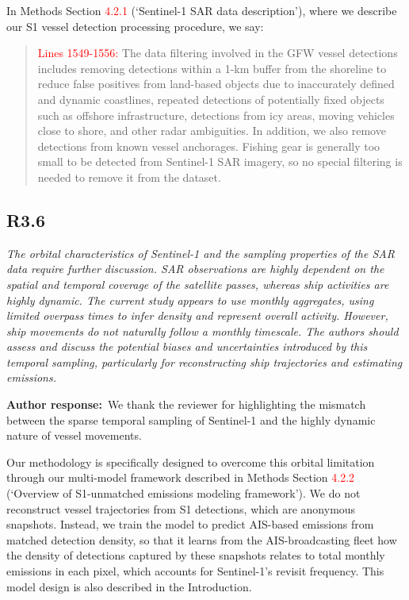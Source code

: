 \documentclass[11pt]{article}
\newcommand{\point}[1]{\subsection*{\normalfont\bfseries #1}}
\newcommand{\response}{\par\medskip\noindent%
  \textbf{\textcolor{respblue}{Author response:}}\ }
\begin{document}
In Methods Section \textcolor{red}{4.2.1} (`Sentinel-1 SAR data description'), where we describe our S1 vessel detection processing procedure, we say:

\begin{quote}
\textcolor{red}{Lines 1549-1556:} The data filtering involved in the GFW vessel detections includes removing detections within a 1-km buffer from the shoreline to reduce false positives from land-based objects due to inaccurately defined and dynamic coastlines, repeated detections of potentially fixed objects such as offshore infrastructure, detections from icy areas, moving vehicles close to shore, and other radar ambiguities. In addition, we also remove detections from known vessel anchorages. Fishing gear is generally too small to be detected from Sentinel-1 SAR imagery, so no special filtering is needed to remove it from the dataset.
\end{quote}

\point{R3.6}

\begin{refquote}\itshape
The orbital characteristics of Sentinel-1 and the sampling properties of the SAR
data require further discussion. SAR observations are highly dependent on the
spatial and temporal coverage of the satellite passes, whereas ship activities
are highly dynamic. The current study appears to use monthly aggregates, using
limited overpass times to infer density and represent overall activity. However,
ship movements do not naturally follow a monthly timescale. The authors should
assess and discuss the potential biases and uncertainties introduced by this
temporal sampling, particularly for reconstructing ship trajectories and
estimating emissions.
\end{refquote}

\response We thank the reviewer for highlighting the mismatch between the sparse temporal sampling of Sentinel-1 and the highly dynamic nature of vessel movements.

Our methodology is specifically designed to overcome this orbital limitation through our multi-model framework described in Methods Section \textcolor{red}{4.2.2} (`Overview of S1-unmatched emissions modeling framework'). We do not reconstruct vessel trajectories from S1 detections, which are anonymous snapshots. Instead, we train the model to predict AIS-based emissions from matched detection density, so that it learns from the AIS-broadcasting fleet how the density of detections captured by these snapshots relates to total monthly emissions in each pixel, which accounts for Sentinel-1's revisit frequency. This model design is also described in the Introduction.
\end{document}
